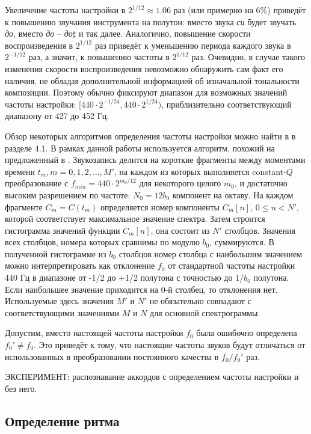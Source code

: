 Увеличение частоты настройки в $2^{1/12} \approx 1.06$ раз (или примерно на 6\%)
приведёт к повышению звучания инструмента на полутон: вместо звука \emph{си}
будет звучать \emph{до}, вместо \emph{до} -- \emph{до}$\sharp$ и так далее.
Аналогично, повышение скорости воспроизведения в $2^{1/12}$ раз приведёт к
уменьшению периода каждого звука в $2^{-1/12}$ раз, а значит, к повышению
частоты в $2^{1/12}$ раз. Очевидно, в случае такого изменения скорости
воспроизведения невозможно обнаружить сам факт его наличия, не обладая
дополнительной информацией об изначальной тональности композиции. Поэтому обычно
фиксируют диапазон для возможных значений частоты настройки: $[440 \cdot
2^{-1/24}, 440 \cdot 2^{1/24})$, приблизительно соответствующий диапазону от 427
до 452 Гц.

Обзор некоторых алгоритмов определения частоты настройки можно найти в
\cite{Lerch2006} в разделе 4.1. В рамках данной работы используется алгоритм,
похожий на предложенный в \cite{Zhu2005}. Звукозапись делится на короткие
фрагменты между моментами времени $t_m, m = 0, 1, 2, \dots, M'$, на каждом из
которых выполняется constant-$Q$ преобразование с $f_{min} = 440 \cdot
2^{m_0/12}$ для некоторого целого $m_0$, и достаточно высоким разрешением по
частоте: $N_0 = 12 b_0$ компонент на октаву. На каждом фрагменте $C_m = C(t_m)$
определяется номер компоненты $C_m[n]$, $0 \leq n < N'$, которой соответствует
максимальное значение спектра. Затем строится гистограмма значений функции
$C_m[n]$, она состоит из $N'$ столбцов. Значения всех столбцов, номера которых
сравнимы по модулю $b_0$, суммируются. В полученной гистограмме из $b_0$
столбцов номер столбца с наибольшим значением можно интерпретировать как
отклонение $f_0$ от стандартной частоты настройки 440 Гц в диапазоне от -1/2 до
+1/2 полутона с точностью до $1/b_0$ полутона. Если наибольшее значение
приходится на 0-й столбец, то отклонения нет. Используемые здесь значения $M'$ и
$N'$ не обязательно совпадают с соответствующими значениями $M$ и $N$ для
основной спектрограммы.

Допустим, вместо настоящей частоты настройки $f_0$ была ошибочно определена
$f_0' \neq f_0$. Это приведёт к тому, что настоящие частоты звуков будут
отличаться от использованных в преобразовании постоянного качества в $f_0 /
f_0'$ раз.

ЭКСПЕРИМЕНТ: распознавание аккордов с определением частоты настройки и без него.

\subsection{Определение ритма} \label{ssect1_rhyhtm}

